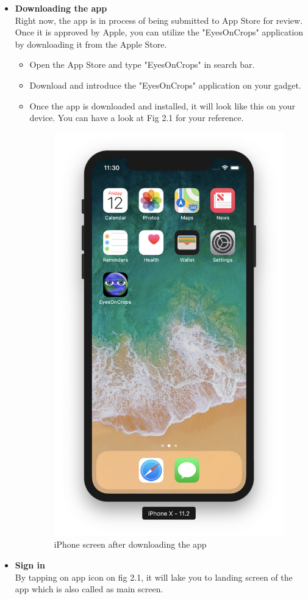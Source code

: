 \begin{itemize}
    \item \textbf{Downloading the app} \\ 
    Right now, the app is in process of being submitted to App Store for review. Once it is approved by Apple, you can utilize the "EyesOnCrops" application by downloading it from the Apple Store. 
    
    \begin{itemize}
        \item Open the App Store and type "EyesOnCrops" in search bar.
        \item Download and introduce the "EyesOnCrops" application on your gadget.
        \item Once the app is downloaded and installed, it will look like this on your device. You can have a look at Fig 2.1 for your reference.
        
        \begin{figure}[H]
            \centering
            \includegraphics[width=0.5\linewidth]{figures/ch2/app_icon_screen.png}
            \caption{\label{fig:app_icon_screen} iPhone screen after downloading the app}
        \end{figure}
    \end{itemize}
    
    \item \textbf{Sign in} \\
    By tapping on app icon on fig 2.1, it will lake you to landing screen of the app which is also called as main screen.
    

\end{itemize}
